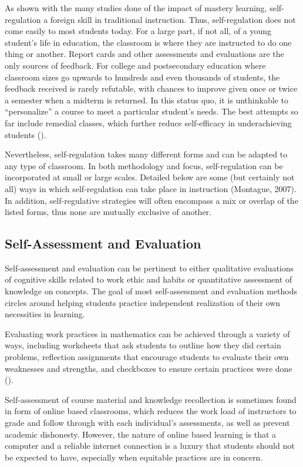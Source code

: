 As shown with the many studies done of the impact of mastery learning, self-regulation a foreign skill in traditional instruction. Thus, self-regulation does not come easily to most students today. For a large part, if not all, of a young student's life in education, the classroom is where they are instructed to do one thing or another. Report cards and other assessments and evaluations are the only sources of feedback. For college and postsecondary education where classroom sizes go upwards to hundreds and even thousands of students, the feedback received is rarely refutable, with chances to improve given once or twice a semester when a midterm is returned. In this status quo, it is unthinkable to ``personalize'' a course to meet a particular student's needs. The best attempts so far include remedial classes, which further reduce self-efficacy in underachieving students (\cite{martin_developmental_2017}).

Nevertheless, self-regulation takes many different forms and can be adapted to any type of classroom. In both methodology and focus, self-regulation can be incorporated at small or large scales. Detailed below are some (but certainly not all) ways in which self-regulation can take place in instruction (Montague, 2007). In addition, self-regulative strategies will often encompass a mix or overlap of the listed forms, thus none are mutually exclusive of another.

\subsection{Self-Assessment and Evaluation}
Self-assessment and evaluation can be pertinent to either qualitative evaluations of cognitive skills related to work ethic and habits or quantitative assessment of knowledge on concepts.
The goal of most self-assessment and evaluation methods circles around helping students practice independent realization of their own necessities in learning.

Evaluating work practices in mathematics can be achieved through a variety of ways, including worksheets that ask students to outline how they did certain problems, reflection assignments that encourage students to evaluate their own weaknesses and strengths, and checkboxes to ensure certain practices were done (\cite{montague_self}).

Self-assessment of course material and knowledge recollection is sometimes found in form of online based classrooms, which reduces the work load of instructors to grade and follow through with each individual's assessments, as well as prevent academic dishonesty. However, the nature of online based learning is that a computer and a reliable internet connection is a luxury that students should not be expected to have, especially when equitable practices are in concern.

